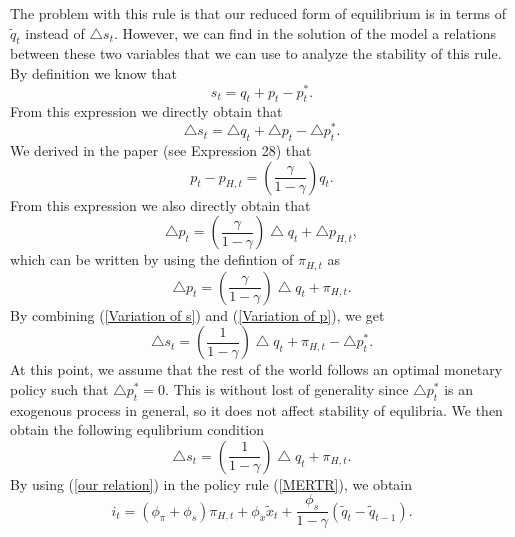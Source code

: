 \documentclass{article}
\begin{document}
The problem with this rule is that our reduced form of equilibrium is in
terms of $\widetilde{q}_{t}$ instead of $\bigtriangleup s_{t}.$ However, we
can find in the solution of the model a relations between these two
variables that we can use to analyze the stability of this rule. By
definition we know that%
\begin{equation*}
s_{t}=q_{t}+p_{t}-p_{t}^{\ast }.
\end{equation*}%
From this expression we directly obtain that%
\begin{equation}
\bigtriangleup s_{t}=\bigtriangleup q_{t}+\bigtriangleup
p_{t}-\bigtriangleup p_{t}^{\ast }.  \label{Variation of s}
\end{equation}%
We derived in the paper (see Expression 28) that%
\begin{equation*}
p_{t}-p_{H,t}=\left( \frac{\gamma }{1-\gamma }\right) q_{t}.
\end{equation*}%
From this expression we also directly obtain that%
\begin{equation*}
\bigtriangleup p_{t}=\left( \frac{\gamma }{1-\gamma }\right) \bigtriangleup
q_{t}+\bigtriangleup p_{H,t},
\end{equation*}%
which can be written by using the defintion of $\pi _{H,t}$ as%
\begin{equation}
\bigtriangleup p_{t}=\left( \frac{\gamma }{1-\gamma }\right) \bigtriangleup
q_{t}+\pi _{H,t}.  \label{Variation of p}
\end{equation}%
By combining (\ref{Variation of s}) and (\ref{Variation of p}), we get%
\begin{equation}
\bigtriangleup s_{t}=\left( \frac{1}{1-\gamma }\right) \bigtriangleup
q_{t}+\pi _{H,t}-\bigtriangleup p_{t}^{\ast }.  \label{Variation of s bis}
\end{equation}%
At this point, we assume that the rest of the world follows an optimal
monetary policy such that $\bigtriangleup p_{t}^{\ast }=0.$ This is without
lost of generality since $\bigtriangleup p_{t}^{\ast }$ is an exogenous
process in general, so it does not affect stability of equlibria. We then
obtain the following equlibrium condition%
\begin{equation}
\bigtriangleup s_{t}=\left( \frac{1}{1-\gamma }\right) \bigtriangleup
q_{t}+\pi _{H,t}.  \label{our relation}
\end{equation}%
By using (\ref{our relation}) in the policy rule (\ref{MERTR}), we obtain%
\begin{equation}
i_{t}=\left( \phi _{\pi }+\phi _{s}\right) \pi _{H,t}+\phi _{x}\widetilde{x}%
_{t}+\frac{\phi _{s}}{1-\gamma }\left( \widetilde{q}_{t}-\widetilde{q}%
_{t-1}\right) .  \label{DIMERTR}
\end{equation}
\end{document}
